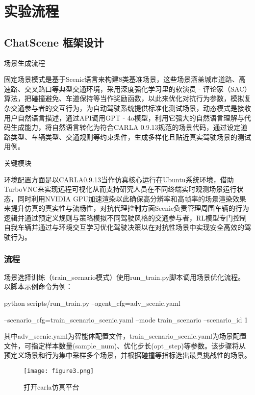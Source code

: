 \chapter{实验流程}

\section{ChatScene 框架设计}

场景生成流程

固定场景模式是基于Scenic语言来构建8类基准场景，这些场景涵盖城市道路、高速路、交叉路口等典型交通环境，采用深度强化学习里的软演员 - 评论家（SAC）算法，把碰撞避免、车道保持等当作奖励函数，以此来优化对抗行为参数，模拟复杂交通参与者的交互行为，为自动驾驶系统提供标准化测试场景，动态模式是接收用户自然语言描述，通过API调用GPT - 4o模型，利用它强大的自然语言理解与代码生成能力，将自然语言转化为符合CARLA 0.9.13规范的场景代码，通过设定道路类型、车辆类型、交通规则等约束条件，生成多样化且贴近真实驾驶场景的测试用例\cite{杨学兵2007决策树算法及其核心技术}。


关键模块

环境配置方面是以CARLA0.9.13当作仿真核心运行在Ubuntu系统环境，借助TurboVNC来实现远程可视化从而支持研究人员在不同终端实时观测场景运行状态，同时利用NVIDIA GPU加速渲染以此确保高分辨率和高帧率的场景渲染效果来提升仿真的真实性与流畅性，对抗代理控制方面Scenic负责管理周围车辆的行为逻辑并通过预定义规则与策略模拟不同驾驶风格的交通参与者，RL模型专门控制自我车辆并通过与环境交互学习优化驾驶决策以在对抗性场景中实现安全高效的驾驶行为\cite{曾星2018基于深度传感器的坐姿检测系统}。

\subsection{流程}

场景选择训练（train\_scenario模式）使用run\_train.py脚本调用场景优化流程。以脚本示例命令为例：

python scripts/run\_train.py --agent\_cfg=adv\_scenic.yaml

--scenario\_cfg=train\_scenario\_scenic.yaml --mode train\_scenario --scenario\_id 1

其中adv\_scenic.yaml为智能体配置文件，train\_scenario\_scenic.yaml为场景配置文件，可指定样本数量(sample\_num)、优化步长(opt\_step)等参数。该步骤将从预定义场景和行为集中采样多个场景，并根据碰撞等指标选出最具挑战性的场景。

\begin{figure}[htbp]
	\centering
	\texttt{[image: figure3.png]} %
	\caption{打开carla仿真平台} %
	\label{fig:example} %
\end{figure}


